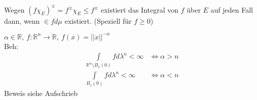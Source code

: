 \documentclass[11pt,a4paper,fleqn,openany]{report}
\begin{document}
    \begin{remark}
      Wegen $(f \chi_E)^{\pm} = f^{\pm} \chi_E \leq f^{\pm}$ existiert das Integral von $f$ über $E$ auf jeden Fall dann, wenn $\in f d\mu$ existiert. (Speziell für $f \geq 0$)
    \end{remark}

    \begin{example}
      $\alpha \in \mathbb{R}, \ f:\mathbb{R}^n \to \mathbb{R}, \ f(x) = ||x||^{-\alpha}$\\
      Beh: 
      \begin{align*}
        \int\limits_{\mathbb{R}^n \setminus B_1(0)} f d\lambda^n < \infty &\Leftrightarrow \alpha > n\\
        \int\limits_{B_1(0)} f d\lambda^n < \infty &\Leftrightarrow \alpha < n
      \end{align*}
      Beweis siehe Aufschrieb
    \end{example}
\end{document}
